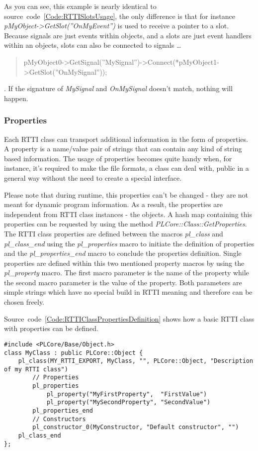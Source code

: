 As you can see, this example is nearly identical to source~code~\ref{Code:RTTISlotsUsage}, the only difference is that for instance \emph{pMyObject->GetSlot(''OnMyEvent'')} is used to receive a pointer to a slot. Because signals are just events within objects, and a slots are just event handlers within an objects, slots can also be connected to signals \ldots \begin{quote}pMyObject0->GetSignal(''MySignal'')->Connect(*pMyObject1->GetSlot(''OnMySignal''));\end{quote}. If the signature of \emph{MySignal} and \emph{OnMySignal} doesn't match, nothing will happen.



\subsubsection{Properties}
Each \ac{RTTI} class can transport additional information in the form of properties. A property is a name/value pair of strings that can contain any kind of string based information. The usage of properties becomes quite handy when, for instance, it's required to make the file formats, a class can deal with, public in a general way without the need to create a  special interface.

Please note that during runtime, this properties can't be changed - they are not meant for dynamic program information. As a result, the properties are independent from \ac{RTTI} class instances - the objects. A hash map containing this properties can be requested by using the method \emph{PLCore::Class::GetProperties}. The \ac{RTTI} class properties are defined between the macros \emph{pl\_class} and \emph{pl\_class\_end} using the \emph{pl\_properties} macro to initiate the definition of properties and the \emph{pl\_properties\_end} macro to conclude the properties definition. Single properties are defined within this two mentioned property macros by using the \emph{pl\_property} macro. The first macro parameter is the name of the property while the second macro parameter is the value of the property. Both parameters are simple strings which have no special build in \ac{RTTI} meaning and therefore can be chosen freely.

Source~code~\ref{Code:RTTIClassPropertiesDefinition} shows how a basic \ac{RTTI} class with properties can be defined.
\begin{lstlisting}[float=htb,label=Code:RTTIClassPropertiesDefinition,caption={Defining a new \ac{RTTI} class with properties}]
#include <PLCore/Base/Object.h>
class MyClass : public PLCore::Object {
	pl_class(MY_RTTI_EXPORT, MyClass, "", PLCore::Object, "Description of my RTTI class")
		// Properties
		pl_properties
			pl_property("MyFirstProperty",  "FirstValue")
			pl_property("MySecondProperty", "SecondValue")
		pl_properties_end
		// Constructors
		pl_constructor_0(MyConstructor, "Default constructor", "")
	pl_class_end
};
\end{lstlisting}

